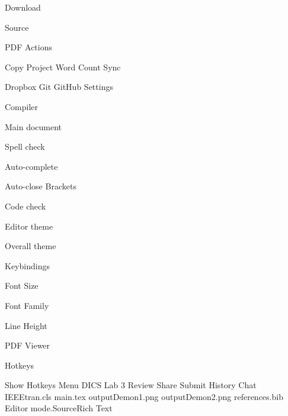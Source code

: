Download


Source

PDF
Actions

   Copy Project
   Word Count
Sync

   Dropbox
   Git
   GitHub
Settings

Compiler

Main document

Spell check

Auto-complete

Auto-close Brackets

Code check

Editor theme

Overall theme

Keybindings

Font Size

Font Family

Line Height

PDF Viewer

Hotkeys

   Show Hotkeys
Menu
DICS Lab 3
Review
Share
Submit
History
Chat
 IEEEtran.cls
 main.tex
 outputDemon1.png
 outputDemon2.png
 references.bib
Editor mode.SourceRich Text


